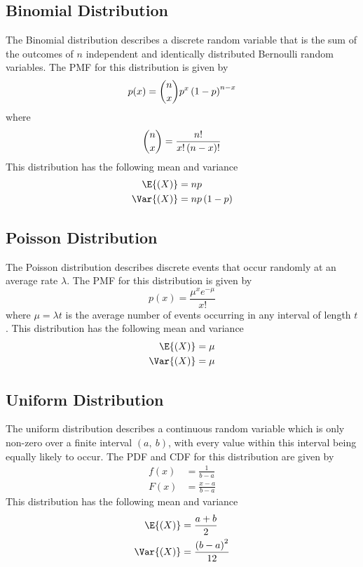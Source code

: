 \documentclass{article}
\begin{document}
\subsection{Binomial Distribution}
The Binomial distribution describes a discrete random variable that is the sum of the outcomes of \(n\)
independent and identically distributed Bernoulli random variables.
The PMF for this distribution is given by
\begin{equation*}
    p(x) = \dbinom{n}{x} p^x \left( 1 - p \right)^{n - x}
\end{equation*}
where
\begin{equation*}
    \dbinom{n}{x} = \frac{n!}{x!\left( n - x \right)!}
\end{equation*}
This distribution has the following mean and variance
\begin{align*}
    \E{\left( X \right)}   & = np                     \\
    \Var{\left( X \right)} & = np\left( 1 - p \right)
\end{align*}
\subsection{Poisson Distribution}
The Poisson distribution describes discrete events that occur randomly at an average rate \(\lambda \).
The PMF for this distribution is given by
\begin{equation*}
    p(x) = \frac{\mu^x e^{-\mu}}{x!}
\end{equation*}
where \(\mu = \lambda t\) is the average number of events occurring in any interval of length \(t\).
This distribution has the following mean and variance
\begin{align*}
    \E{\left( X \right)}   & = \mu \\
    \Var{\left( X \right)} & = \mu
\end{align*}
\subsection{Uniform Distribution}
The uniform distribution describes a continuous random variable which is only non-zero over a finite interval \(\left( a,\: b \right)\),
with every value within this interval being equally likely to occur. The PDF and CDF for this distribution are given by
\begin{align*}
    f(x) & = \frac{1}{b - a}     \\
    F(x) & = \frac{x - a}{b - a}
\end{align*}
This distribution has the following mean and variance
\begin{align*}
    \E{\left( X \right)}   & = \frac{a + b}{2}                   \\
    \Var{\left( X \right)} & = \frac{\left( b - a \right)^2}{12}
\end{align*}
\end{document}

